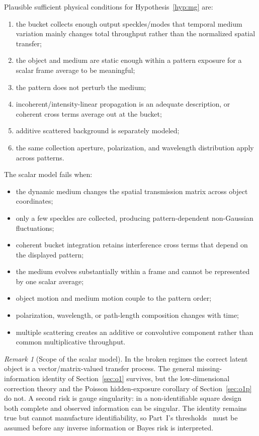 \documentclass[11pt]{article}
\theoremstyle{remark}
\newtheorem{remark}{Remark}
\begin{document}
Plausible sufficient physical conditions for Hypothesis~\ref{hyp:mg} are:
\begin{enumerate}
\item the bucket collects enough output speckles/modes that temporal medium
variation mainly changes total throughput rather than the normalized spatial
transfer;
\item the object and medium are static enough within a pattern exposure for a
scalar frame average to be meaningful;
\item the pattern does not perturb the medium;
\item incoherent/intensity-linear propagation is an adequate description, or
coherent cross terms average out at the bucket;
\item additive scattered background is separately modeled;
\item the same collection aperture, polarization, and wavelength distribution
apply across patterns.
\end{enumerate}

The scalar model fails when:
\begin{itemize}
\item the dynamic medium changes the spatial transmission matrix across object
coordinates;
\item only a few speckles are collected, producing pattern-dependent
non-Gaussian fluctuations;
\item coherent bucket integration retains interference cross terms that depend
on the displayed pattern;
\item the medium evolves substantially within a frame and cannot be represented
by one scalar average;
\item object motion and medium motion couple to the pattern order;
\item polarization, wavelength, or path-length composition changes with time;
\item multiple scattering creates an additive or convolutive component rather
than common multiplicative throughput.
\end{itemize}

\begin{remark}[Scope of the scalar model]
\label{rem:mg-scope}
In the broken regimes the correct latent object is a vector/matrix-valued
transfer process. The general missing-information identity of
Section~\ref{sec:o1} survives, but the low-dimensional correction theory and
the Poisson hidden-exposure corollary of Section~\ref{sec:o1p} do not. A second
risk is gauge singularity: in a non-identifiable square design both complete and
observed information can be singular. The identity remains true but cannot
manufacture identifiability, so Part~I's thresholds~\cite{companion} must be
assumed before any inverse information or Bayes risk is interpreted.
\end{remark}
\end{document}
